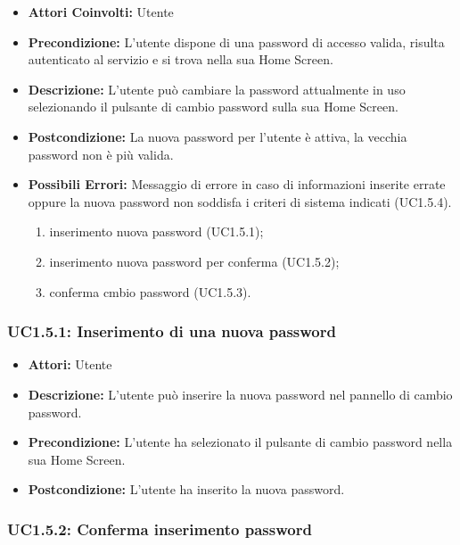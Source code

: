 \begin{itemize}
    \item \textbf{Attori Coinvolti:} Utente
    \item \textbf{Precondizione:} L'utente dispone di una password di accesso valida, risulta autenticato al servizio e si trova nella sua Home Screen.
    \item \textbf{Descrizione:} L'utente può cambiare la password attualmente in uso selezionando il pulsante di cambio password sulla sua Home Screen.
    \item \textbf{Postcondizione:} La nuova password per l'utente è attiva, la vecchia password non è più valida.
    \item \textbf{Possibili Errori:} Messaggio di errore in caso di informazioni inserite errate oppure la nuova password non soddisfa i criteri di sistema indicati (UC1.5.4).

    \begin{enumerate}
        \item inserimento nuova password (UC1.5.1);
        \item inserimento nuova password per conferma (UC1.5.2);
        \item conferma cmbio password (UC1.5.3).
    \end{enumerate}

\end{itemize}

\subsubsection{UC1.5.1: Inserimento di una nuova password}

\begin{itemize}
    \item \textbf{Attori:} Utente
    \item \textbf{Descrizione:} L'utente può inserire la nuova password nel pannello di cambio password.
    \item \textbf{Precondizione:} L'utente ha selezionato il pulsante di cambio password nella sua Home Screen.
    \item \textbf{Postcondizione:} L'utente ha inserito la nuova password.
\end{itemize}

\subsubsection{UC1.5.2: Conferma inserimento password }


